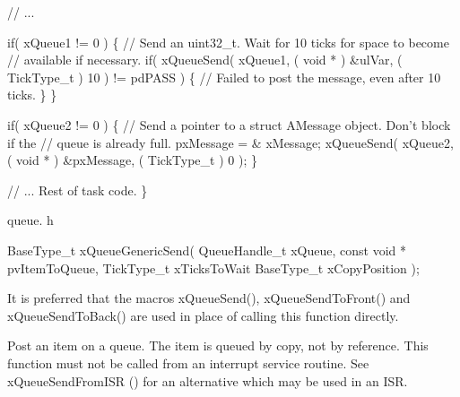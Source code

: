 \begin{DoxyPre}   // ...\end{DoxyPre}



\begin{DoxyPre}   if( xQueue1 != 0 )
   \{
    // Send an uint32\_t.  Wait for 10 ticks for space to become
    // available if necessary.
    if( xQueueSend( xQueue1, ( void * ) \&ulVar, ( TickType\_t ) 10 ) != pdPASS )
    \{
        // Failed to post the message, even after 10 ticks.
    \}
   \}\end{DoxyPre}



\begin{DoxyPre}   if( xQueue2 != 0 )
   \{
    // Send a pointer to a struct AMessage object.  Don't block if the
    // queue is already full.
    pxMessage = \& xMessage;
    xQueueSend( xQueue2, ( void * ) \&pxMessage, ( TickType\_t ) 0 );
   \}\end{DoxyPre}



\begin{DoxyPre}   // ... Rest of task code.
\}
\end{DoxyPre}


queue. h 
\begin{DoxyPre}
BaseType\_t xQueueGenericSend(
                                QueueHandle\_t xQueue,
                                const void * pvItemToQueue,
                                TickType\_t xTicksToWait
                                BaseType\_t xCopyPosition
                            );
  \end{DoxyPre}


It is preferred that the macros x\+Queue\+Send(), x\+Queue\+Send\+To\+Front() and x\+Queue\+Send\+To\+Back() are used in place of calling this function directly.

Post an item on a queue. The item is queued by copy, not by reference. This function must not be called from an interrupt service routine. See x\+Queue\+Send\+From\+I\+SR () for an alternative which may be used in an I\+SR.


